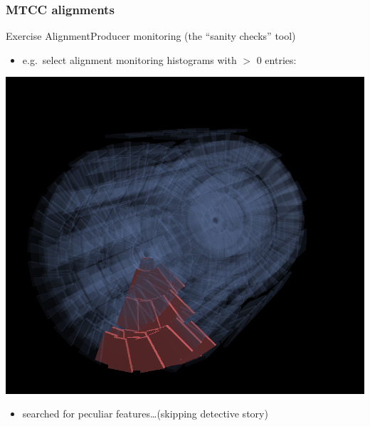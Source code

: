 \documentclass[compress]{beamer}
\begin{document}
\begin{frame}
\frametitle{MTCC alignments}

Exercise AlignmentProducer monitoring (the ``sanity checks'' tool) \mbox{\hspace{-1 cm}}
\begin{itemize}
\item e.g.\ select alignment monitoring histograms with $>$ 0 entries:
\end{itemize}

\begin{center}
\includegraphics[width=0.5\linewidth]{mtcc_chambers.png}
\end{center}

\vspace{-0.25 cm}
\begin{itemize}
\item searched for peculiar features\ldots (skipping detective story)
\end{itemize}
\end{frame}
\end{document}
